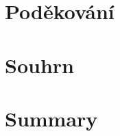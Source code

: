 
%

%

%


\newpage
\thispagestyle{empty}

\vspace*{\fill}
\section*{Poděkování}
\mbox

\newpage
\thispagestyle{empty}

\section*{Souhrn}
\section*{Summary}


\newpage
\thispagestyle{empty}
\tableofcontents
{}
